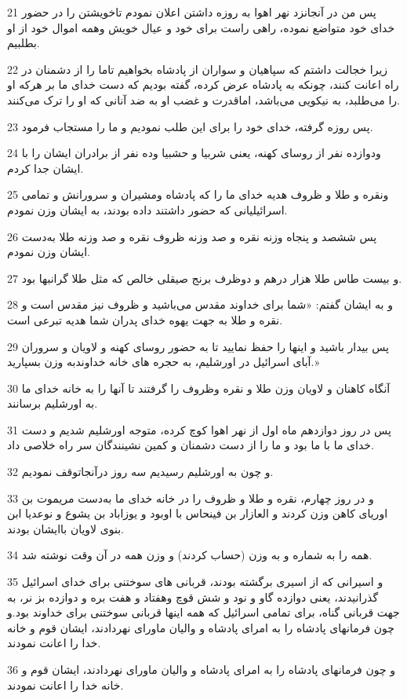 \par 21 پس من در آنجانزد نهر اهوا به روزه داشتن اعلان نمودم تاخویشتن را در حضور خدای خود متواضع نموده، راهی راست برای خود و عیال خویش وهمه اموال خود از او بطلبیم.
\par 22 زیرا خجالت داشتم که سپاهیان و سواران از پادشاه بخواهیم تاما را از دشمنان در راه اعانت کنند، چونکه به پادشاه عرض کرده، گفته بودیم که دست خدای ما بر هر‌که او را می‌طلبد، به نیکویی می‌باشد، اماقدرت و غضب او به ضد آنانی که او را ترک می‌کنند.
\par 23 پس روزه گرفته، خدای خود را برای این طلب نمودیم و ما را مستجاب فرمود.
\par 24 ودوازده نفر از روسای کهنه، یعنی شربیا و حشبیا وده نفر از برادران ایشان را با ایشان جدا کردم.
\par 25 ونقره و طلا و ظروف هدیه خدای ما را که پادشاه ومشیران و سرورانش و تمامی اسرائیلیانی که حضور داشتند داده بودند، به ایشان وزن نمودم.
\par 26 پس ششصد و پنجاه وزنه نقره و صد وزنه ظروف نقره و صد وزنه طلا به‌دست ایشان وزن نمودم.
\par 27 و بیست طاس طلا هزار درهم و دوظرف برنج صیقلی خالص که مثل طلا گرانبها بود.
\par 28 و به ایشان گفتم: «شما برای خداوند مقدس می‌باشید و ظروف نیز مقدس است و نقره و طلا به جهت یهوه خدای پدران شما هدیه تبرعی است.
\par 29 پس بیدار باشید و اینها را حفظ نمایید تا به حضور روسای کهنه و لاویان و سروران آبای اسرائیل در اورشلیم، به حجره های خانه خداوندبه وزن بسپارید.»
\par 30 آنگاه کاهنان و لاویان وزن طلا و نقره وظروف را گرفتند تا آنها را به خانه خدای ما به اورشلیم برسانند.
\par 31 پس در روز دوازدهم ماه اول از نهر اهوا کوچ کرده، متوجه اورشلیم شدیم و دست خدای ما با ما بود و ما را از دست دشمنان و کمین نشینندگان سر راه خلاصی داد.
\par 32 و چون به اورشلیم رسیدیم سه روز درآنجاتوقف نمودیم.
\par 33 و در روز چهارم، نقره و طلا و ظروف را در خانه خدای ما به‌دست مریموت بن اوریای کاهن وزن کردند و العازار بن فینحاس با اوبود و یوزاباد بن یشوع و نوعدیا ابن بنوی لاویان باایشان بودند.
\par 34 همه را به شماره و به وزن (حساب کردند) و وزن همه در آن وقت نوشته شد.
\par 35 و اسیرانی که از اسیری برگشته بودند، قربانی های سوختنی برای خدای اسرائیل گذرانیدند، یعنی دوازده گاو و نود و شش قوچ وهفتاد و هفت بره و دوازده بز نر، به جهت قربانی گناه، برای تمامی اسرائیل که همه اینها قربانی سوختنی برای خداوند بود.و چون فرمانهای پادشاه را به امرای پادشاه و والیان ماورای نهردادند، ایشان قوم و خانه خدا را اعانت نمودند.
\par 36 و چون فرمانهای پادشاه را به امرای پادشاه و والیان ماورای نهردادند، ایشان قوم و خانه خدا را اعانت نمودند.
 
